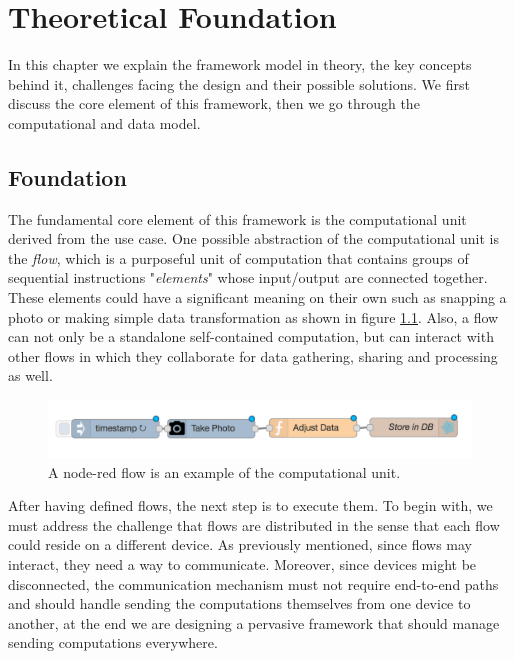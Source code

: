 
\chapter{Theoretical Foundation}\label{chapter:Foundation}
In this chapter we explain the framework model in theory, the key concepts behind it, challenges facing the design and their possible solutions. We first discuss the core element of this framework, then we go through the computational and data model.


\section{Foundation}\label{sec:foundation}
	The fundamental core element of this framework is the computational unit derived from the use case. One possible abstraction of the computational unit is the \textit{flow}, which is a purposeful unit of computation that contains groups of sequential instructions "\textit{elements}" whose input/output are connected together. These elements could have a significant meaning on their own such as snapping a photo or making simple data transformation as shown in figure \ref{fig:flow}. Also, a flow can not only be a standalone self-contained computation, but can interact with other flows in which they collaborate for data gathering, sharing and processing as well.
	
	
\begin{figure}[H]
	\centering
	\includegraphics[scale=0.5]{images/db-out.png} 
	\caption{A node-red flow is an example of the computational unit.}
	\label{fig:flow}
\end{figure}

\noindent After having defined flows, the next step is to execute them. To begin with, we must address the challenge that flows are distributed in the sense that each flow could reside on a different device. As previously mentioned,  since flows may interact, they need a way to communicate. Moreover, since devices might be disconnected,  the communication mechanism must not require end-to-end paths and should handle sending the computations themselves from one device to another, at the end we are designing a pervasive framework that should manage sending computations everywhere.\\

